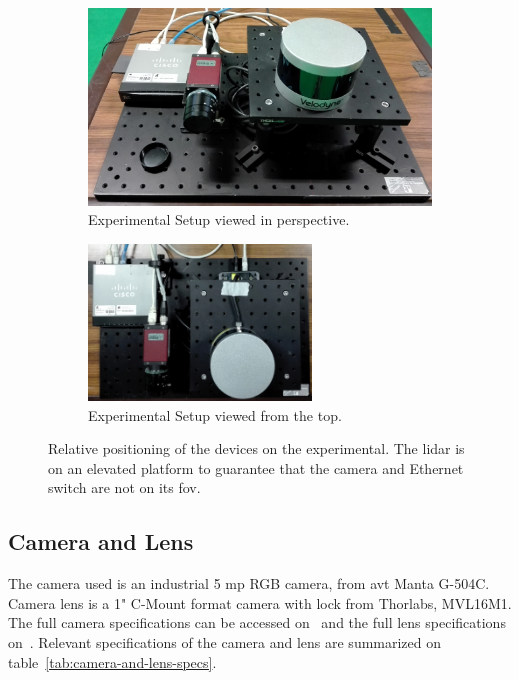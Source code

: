 \begin{figure}[H]
	\centering
	\begin{subfigure}[c]{0.45\textwidth}
		\includegraphics[width=\textwidth]{img/experimental-setup/table-setup-cambada-perspective.jpg}
		\caption{Experimental Setup viewed in perspective.}
		\label{fig:experimental-setup:perspective}
	\end{subfigure}
	\qquad
	\begin{subfigure}[c]{0.45\textwidth}
		\includegraphics[width=0.65\textwidth, keepaspectratio, angle=90]{img/experimental-setup/table-setup-cambada-birds-eye.jpg}
		\caption{Experimental Setup viewed from the top.}
		\label{fig:experimental-setup:birds-eye}
	\end{subfigure}
	\caption{Relative positioning of the devices on the experimental. The \ac{lidar} is on an elevated platform to guarantee that the camera and Ethernet switch are not on its \ac{fov}.}
	\label{fig:experimental-setup}
\end{figure}

\subsection{Camera and Lens}
The camera used is an industrial 5 \ac{mp} RGB camera, from \acf{avt}  Manta G-504C. Camera lens is a 1" C-Mount format camera with lock from Thorlabs\cp, MVL16M1. The full camera specifications can be accessed on~\cite{MantaG504C} and the full lens specifications on~\cite{Thorlabs}. Relevant specifications of the camera and lens are summarized  on table~\ref{tab:camera-and-lens-specs}. 

